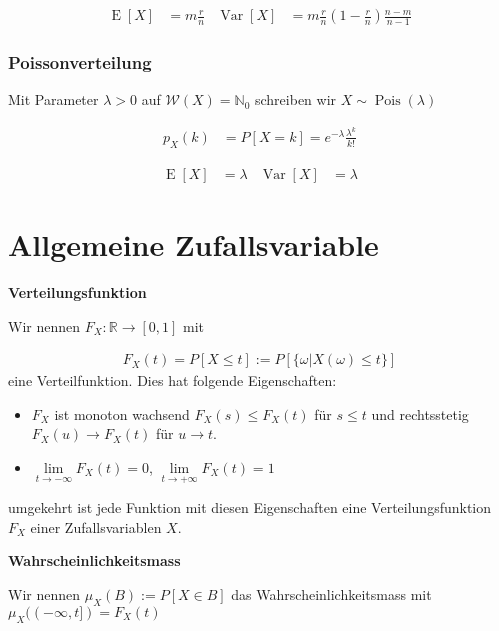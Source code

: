 \documentclass[25pt]{sciposter}
\newcommand{\R}{\mathbb{R}}
\newcommand{\N}{\mathbb{N}}
\newcommand{\W}{\mathcal{W}}
\newcommand{\Var}{\operatorname{Var}}
\newcommand{\E}{\operatorname{E}}
\newenvironment{method}[1]{\begin{mdframed}[backgroundcolor=blue!10,innertopmargin=15pt, innerbottommargin=15pt,nobreak=true]
		\textbf{#1 }
	}
	{ 
	\end{mdframed}
}
\begin{document}
\begin{multicols}{3}
\begin{align*}
\E[X] &= m\frac{r}{n} & \Var[X] &= m\frac{r}{n}\left(1-\frac{r}{n}\right) \frac{n-m}{n-1}
\end{align*}



\subsubsection*{Poissonverteilung}

Mit Parameter $\lambda>0$ auf $\W(X) = \N_0$ schreiben wir $X\sim {\operatorname{Pois}}(\lambda)$

\begin{align*}
	p_X(k) &= P[X = k] = e^{-\lambda} \frac{\lambda^k}{k!}
\end{align*}

\begin{align*}
\E[X] &= \lambda & \Var[X] &= \lambda
\end{align*}



\newpage

\section{Allgemeine Zufallsvariable}



\begin{method}{Verteilungsfunktion}
	Wir nennen $F_X : \R \to [0,1]$ mit 
	
	\begin{align*}
		F_X (t) = P[X\leq t]:= P[\{\omega | X(\omega) \leq t\}]
	\end{align*}
	eine Verteilfunktion. Dies hat folgende Eigenschaften:
	\begin{itemize}
		\item $F_X$ ist monoton wachsend $F_X(s)\leq F_X(t)$ für $s\leq t$ und rechtsstetig $F_X(u) \to F_X(t)$ für $u \to t$.
		\item $\lim\limits_{t\to-\infty} F_X(t) = 0$, $\lim\limits_{t\to + \infty} F_X(t) = 1$ 
	\end{itemize}
	umgekehrt ist jede Funktion mit diesen Eigenschaften eine Verteilungsfunktion $F_X$ einer Zufallsvariablen $X$.
\end{method}


\begin{method}{Wahrscheinlichkeitsmass}
	Wir nennen $\mu_X(B) := P[X \in B]$ das Wahrscheinlichkeitsmass mit $\mu_X((-\infty,t]) = F_X(t)$
\end{method}


\end{multicols}
\end{document}
